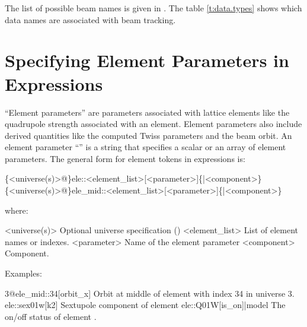 The list of possible beam  names is given in . The table
\ref{t:data.types} shows which data names are associated with beam tracking.

\section{Specifying Element Parameters in Expressions}
\label{s:ele.token}

``Element parameters'' are parameters associated with lattice elements like the quadrupole strength
associated with an element. Element parameters also include derived quantities like the computed
Twiss parameters and the beam orbit. An element parameter ``'' is a string that specifies
a scalar or an array of element parameters. The general form for element tokens in expressions is:
\begin{example}
  \{<universe(s)>@\}ele::<element_list>[<parameter>]\{|<component>\}
  \{<universe(s)>@\}ele_mid::<element_list>[<parameter>]\{|<component>\}
\end{example}
where:
\begin{example}
  <universe(s)>       Optional universe specification ()
  <element_list>      List of element names or indexes.
  <parameter>         Name of the element parameter
  <component>         Component. 
\end{example}
Examples:
\begin{example}
  3@ele_mid::34[orbit_x]     Orbit at middle of element with index 34 in universe 3.
  ele::sex01w[k2]            Sextupole component of element 
  ele::Q01W[is_on]|model     The on/off status of element .
\end{example}


